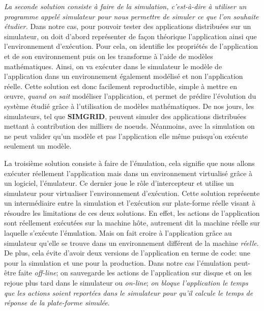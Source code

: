 {\color{red}\textit{La seconde solution consiste à faire de la simulation, c'est-à-dire à utiliser un programme appelé simulateur pour nous permettre de simuler ce que l'on souhaite étudier.}} Dans notre cas, pour pouvoir tester des applications distribuées sur un simulateur, on doit d'abord représenter de façon théorique l'application ainsi que l'environnement d'exécution. Pour cela, on identifie les propriétés de l'application et de son environnement puis on les transforme à l'aide de modèles mathématiques. Ainsi, on va exécuter dans le simulateur le modèle de l'application dans un environnement également modélisé et non l'application réelle. Cette solution est donc facilement reproductible, simple à mettre en \oe uvre, \textit{ quand on sait} modéliser l'application, et permet de prédire l'évolution du système étudié grâce à l'utilisation de modèles mathématiques. De nos jours, les simulateurs, tel que  \textbf{SIMGRID}\cite{SIMULATION:CASANOVA, SIMULATION:MARTIN}, peuvent simuler des applications distribuées mettant à contribution des milliers de noeuds. Néanmoins, avec la simulation on ne peut valider qu'un modèle et pas l'application elle même puisqu'on exécute seulement un modèle. 

La troisième solution consiste à faire de l'émulation, cela signifie que nous allons exécuter réellement l'application mais dans un environnement virtualisé grâce à un logiciel, l'émulateur. Ce dernier joue le rôle d'intercepteur et utilise un simulateur pour virtualiser l'environnement d'exécution.
Cette solution représente un intermédiaire entre la simulation et l'exécution sur plate-forme réelle visant à résoudre les limitations de ces deux solutions. En effet, les actions de l'application sont réellement exécutées sur la machine hôte, autrement dit la machine réelle sur laquelle s'exécute l'émulation. Mais on fait croire à l'application grâce au simulateur qu'elle se trouve dans un environnement différent de la machine \textit{réelle}. De plus, cela évite d'avoir deux versions de l'application en terme de code: une pour la simulation et une pour la production. Dans notre cas l'émulation peut-être faite \textit{off-line}; on sauvegarde les actions de l'application sur disque et on les rejoue plus tard dans le simulateur ou \textit{on-line}; \textit{ on bloque l'application le temps que les actions soient reportées dans le simulateur pour qu'il calcule le temps de réponse de la plate-forme simulée}.

